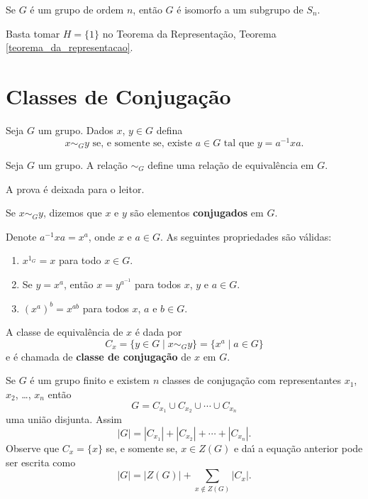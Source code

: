\begin{corolario}\label{teorema_de_cayley}
	Se $G$ \'e um grupo de ordem $n$, ent\~ao $G$ \'e isomorfo a um subgrupo de $S_n$.
\end{corolario}
\begin{prova}
	Basta tomar $H = \{1\}$ no Teorema da Representa\c{c}\~ao, Teorema \ref{teorema_da_representacao}.
\end{prova}


\section{Classes de Conjuga\c{c}\~ao} %
\label{sec:classes_de_conjugacao}

Seja $G$ um grupo. Dados $x$, $y \in G$ defina
\[
	x \sim_G y \mbox{ se, e somente se, existe } a \in G \mbox{ tal que } y = a^{-1}xa.
\]

\begin{proposicao}
	Seja $G$ um grupo. A rela\c{c}\~ao $\sim_G$ define uma rela\c{c}\~ao de equival\^encia em $G$.
\end{proposicao}
\begin{prova}
	A prova \'e deixada para o leitor.
\end{prova}

\begin{definicao}
	Se $x \sim_G y$, dizemos que $x$ e $y$ s\~ao elementos \textbf{conjugados} em $G$.
\end{definicao}

Denote $a^{-1}xa = x^a$, onde $x$ e $a \in G$. As seguintes propriedades s\~ao v\'alidas:
\begin{enumerate}[label=({\arabic*})]
	\item $x^{1_G} = x$ para todo $x \in G$.

	\item Se $y = x^a$, ent\~ao $x = y^{a^{-1}}$ para todos $x$, $y$ e $a \in G$.

	\item $(x^a)^b = x^{ab}$ para todos $x$, $a$ e $b \in G$.
\end{enumerate}

A classe de equival\^encia de $x$ \'e dada por
\[
	C_x = \{y \in G \mid x \sim_G y\} = \{x^a \mid a \in G\}
\]
e \'e chamada de \textbf{classe de conjuga\c{c}\~ao} de $x$ em $G$.

Se $G$ \'e um grupo finito e existem $n$ classes de conjuga\c{c}\~ao com representantes $x_1$, $x_2$, \dots, $x_n$ ent\~ao
\[
	G = C_{x_1} \cup C_{x_2} \cup \cdots \cup C_{x_n}
\]
uma uni\~ao disjunta. Assim
\[
	|G| = |C_{x_1}| + |C_{x_2}| + \cdots + |C_{x_n}|.
\]
Observe que $C_x = \{x\}$ se, e somente se, $x \in Z(G)$ e da{\'\i} a equa\c{c}\~ao anterior pode ser escrita como
\begin{equation}\label{equacao_de_classes}
	|G| = |Z(G)| + \sum_{x \notin Z(G)}|C_x|.
\end{equation}

